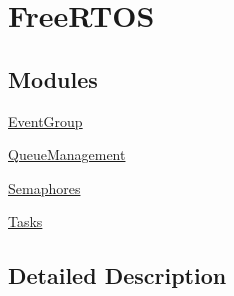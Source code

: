 \hypertarget{group___free_r_t_o_s}{}\section{Free\+R\+T\+OS}
\label{group___free_r_t_o_s}
\subsection*{Modules}
\begin{DoxyCompactItemize}
\item 
\hyperlink{group___event_group}{Event\+Group}
\item 
\hyperlink{group___queue_management}{Queue\+Management}
\item 
\hyperlink{group___semaphores}{Semaphores}
\item 
\hyperlink{group___tasks}{Tasks}
\end{DoxyCompactItemize}


\subsection{Detailed Description}
